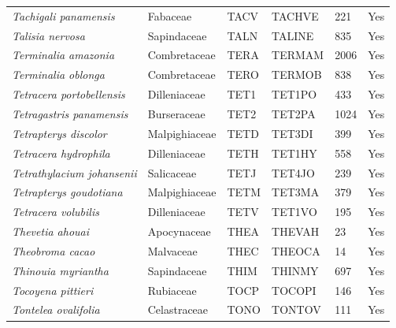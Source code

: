 \documentclass[11pt]{article}
\begin{document}
\begin{longtable}{@{}llllll@{}}
\textit{Tachigali panamensis}                         & Fabaceae         & TACV   & TACHVE & 221             & Yes       \\
\textit{Talisia nervosa}                              & Sapindaceae      & TALN   & TALINE & 835             & Yes       \\
\textit{Terminalia amazonia}                          & Combretaceae     & TERA   & TERMAM & 2006            & Yes       \\
\textit{Terminalia oblonga}                           & Combretaceae     & TERO   & TERMOB & 838             & Yes       \\
\textit{Tetracera portobellensis}                     & Dilleniaceae     & TET1   & TET1PO & 433             & Yes       \\
\textit{Tetragastris panamensis}                      & Burseraceae      & TET2   & TET2PA & 1024            & Yes       \\
\textit{Tetrapterys discolor}                         & Malpighiaceae    & TETD   & TET3DI & 399             & Yes       \\
\textit{Tetracera hydrophila}                         & Dilleniaceae     & TETH   & TET1HY & 558             & Yes       \\
\textit{Tetrathylacium johansenii}                    & Salicaceae       & TETJ   & TET4JO & 239             & Yes       \\
\textit{Tetrapterys goudotiana}                       & Malpighiaceae    & TETM   & TET3MA & 379             & Yes       \\
\textit{Tetracera volubilis}                          & Dilleniaceae     & TETV   & TET1VO & 195             & Yes       \\
\textit{Thevetia ahouai}                              & Apocynaceae      & THEA   & THEVAH & 23              & Yes       \\
\textit{Theobroma cacao}                              & Malvaceae        & THEC   & THEOCA & 14              & Yes       \\
\textit{Thinouia myriantha}                           & Sapindaceae      & THIM   & THINMY & 697             & Yes       \\
\textit{Tocoyena pittieri}                            & Rubiaceae        & TOCP   & TOCOPI & 146             & Yes       \\
\textit{Tontelea ovalifolia}                          & Celastraceae     & TONO   & TONTOV & 111             & Yes       \\

\end{longtable}
\end{document}
